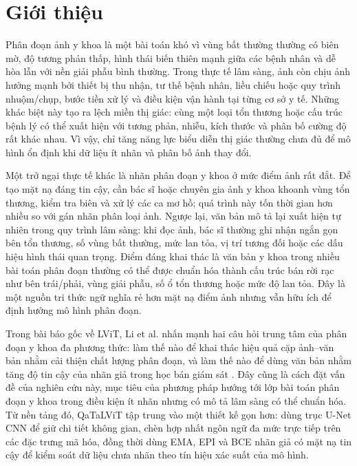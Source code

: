 ﻿\section{Giới thiệu}
\label{sec:intro}

Phân đoạn ảnh y khoa là một bài toán khó vì vùng bất thường thường có biên mờ, độ tương phản thấp, hình thái biến thiên mạnh giữa các bệnh nhân và dễ hòa lẫn với nền giải phẫu bình thường. Trong thực tế lâm sàng, ảnh còn chịu ảnh hưởng mạnh bởi thiết bị thu nhận, tư thế bệnh nhân, liều chiếu hoặc quy trình nhuộm/chụp, bước tiền xử lý và điều kiện vận hành tại từng cơ sở y tế. Những khác biệt này tạo ra lệch miền thị giác: cùng một loại tổn thương hoặc cấu trúc bệnh lý có thể xuất hiện với tương phản, nhiễu, kích thước và phân bố cường độ rất khác nhau. Vì vậy, chỉ tăng năng lực biểu diễn thị giác thường chưa đủ để mô hình ổn định khi dữ liệu ít nhãn và phân bố ảnh thay đổi.

Một trở ngại thực tế khác là nhãn phân đoạn y khoa ở mức điểm ảnh rất đắt. Để tạo mặt nạ đáng tin cậy, cần bác sĩ hoặc chuyên gia ảnh y khoa khoanh vùng tổn thương, kiểm tra biên và xử lý các ca mơ hồ; quá trình này tốn thời gian hơn nhiều so với gán nhãn phân loại ảnh. Ngược lại, văn bản mô tả lại xuất hiện tự nhiên trong quy trình lâm sàng: khi đọc ảnh, bác sĩ thường ghi nhận ngắn gọn bên tổn thương, số vùng bất thường, mức lan tỏa, vị trí tương đối hoặc các dấu hiệu hình thái quan trọng. Điểm đáng khai thác là văn bản y khoa trong nhiều bài toán phân đoạn thường có thể được chuẩn hóa thành cấu trúc bán rời rạc như bên trái/phải, vùng giải phẫu, số ổ tổn thương hoặc mức độ lan tỏa. Đây là một nguồn tri thức ngữ nghĩa rẻ hơn mặt nạ điểm ảnh nhưng vẫn hữu ích để định hướng mô hình phân đoạn.

Trong bài báo gốc về LViT, Li et al. nhấn mạnh hai câu hỏi trung tâm của phân đoạn y khoa đa phương thức: làm thế nào để khai thác hiệu quả cặp ảnh--văn bản nhằm cải thiện chất lượng phân đoạn, và làm thế nào để dùng văn bản nhằm tăng độ tin cậy của nhãn giả trong học bán giám sát \cite{li2023lvit}. Đây cũng là cách đặt vấn đề của nghiên cứu này, mục tiêu của phương pháp hướng tới lớp bài toán phân đoạn y khoa trong điều kiện ít nhãn nhưng có mô tả lâm sàng có thể chuẩn hóa. Từ nền tảng đó, QaTaLViT tập trung vào một thiết kế gọn hơn: dùng trục U-Net CNN để giữ chi tiết không gian, chèn hợp nhất ngôn ngữ đa mức trực tiếp trên các đặc trưng mã hóa, đồng thời dùng EMA, EPI và BCE nhãn giả có mặt nạ tin cậy để kiểm soát dữ liệu chưa nhãn theo tín hiệu xác suất của mô hình.

